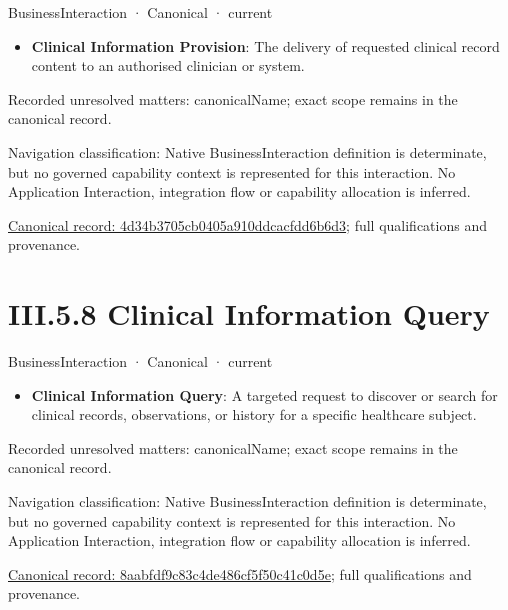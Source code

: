 \label{element:4d34b3705cb0405a910ddcacfdd6b6d3}
{\small BusinessInteraction · Canonical · current}\par

\begin{itemize}


\item \textbf{Clinical Information Provision}: The delivery of requested clinical record content to an authorised clinician or system.

\end{itemize}

{\small Recorded unresolved matters: canonicalName; exact scope remains in the canonical record.}\par
{\small Navigation classification: Native BusinessInteraction definition is determinate, but no governed capability context is represented for this interaction. No Application Interaction, integration flow or capability allocation is inferred.}\par
{\footnotesize \href{../../../../continuum/business/business-interaction/4d34b3705cb0405a910ddcacfdd6b6d3.md}{Canonical record: 4d34b3705cb0405a910ddcacfdd6b6d3}; full qualifications and provenance.}\par
\section*{III.5.8 Clinical Information Query}
\label{navigation:III.5.8}

\label{element:8aabfdf9c83c4de486cf5f50c41c0d5e}
{\small BusinessInteraction · Canonical · current}\par

\begin{itemize}


\item \textbf{Clinical Information Query}: A targeted request to discover or search for clinical records, observations, or history for a specific healthcare subject.

\end{itemize}

{\small Recorded unresolved matters: canonicalName; exact scope remains in the canonical record.}\par
{\small Navigation classification: Native BusinessInteraction definition is determinate, but no governed capability context is represented for this interaction. No Application Interaction, integration flow or capability allocation is inferred.}\par
{\footnotesize \href{../../../../continuum/business/business-interaction/8aabfdf9c83c4de486cf5f50c41c0d5e.md}{Canonical record: 8aabfdf9c83c4de486cf5f50c41c0d5e}; full qualifications and provenance.}\par
